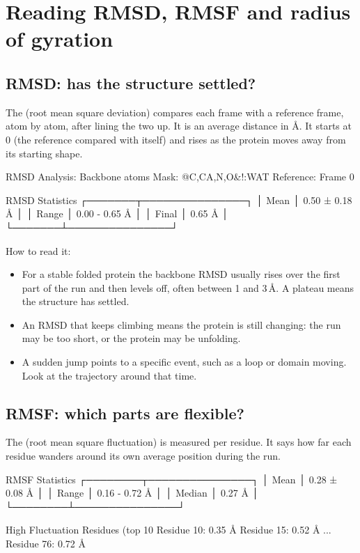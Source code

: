 \section{Reading RMSD, RMSF and radius of gyration}\label{sec:analysis-reading}

\subsection{RMSD: has the structure settled?}

The  (root mean square deviation) compares each frame with a
reference frame, atom by atom, after lining the two up. It is an average
distance in Å. It starts at 0 (the reference compared with itself) and rises
as the protein moves away from its starting shape.

\begin{screen}
RMSD Analysis: Backbone atoms
Mask: @C,CA,N,O&!:WAT
Reference: Frame 0

     RMSD Statistics
┌───────┬───────────────┐
│ Mean  │ 0.50 ± 0.18 Å │
│ Range │ 0.00 - 0.65 Å │
│ Final │ 0.65 Å        │
└───────┴───────────────┘
\end{screen}

How to read it:
\begin{itemize}
  \item For a stable folded protein the backbone RMSD usually rises over the
        first part of the run and then levels off, often between 1 and 3\,Å.
        A plateau means the structure has settled.
  \item An RMSD that keeps climbing means the protein is still changing:
        the run may be too short, or the protein may be unfolding.
  \item A sudden jump points to a specific event, such as a loop or domain
        moving. Look at the trajectory around that time.
\end{itemize}

\subsection{RMSF: which parts are flexible?}

The  (root mean square fluctuation) is measured per residue. It
says how far each residue wanders around its own average position during the
run.

\begin{screen}
     RMSF Statistics
┌────────┬───────────────┐
│ Mean   │ 0.28 ± 0.08 Å │
│ Range  │ 0.16 - 0.72 Å │
│ Median │ 0.27 Å        │
└────────┴───────────────┘

High Fluctuation Residues (top 10%
  Residue 10: 0.35 Å
  Residue 15: 0.52 Å
...
  Residue 76: 0.72 Å
\end{screen}

